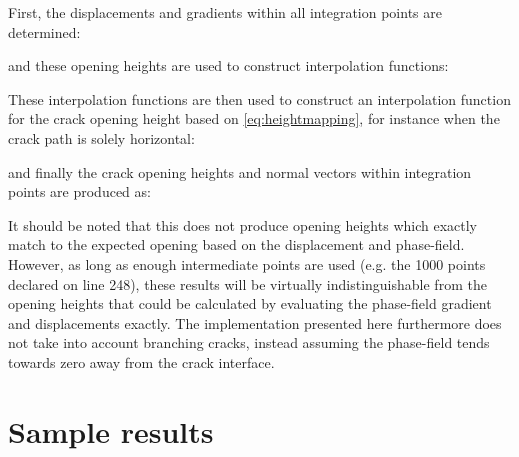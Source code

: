\documentclass[3p]{elsarticle} %
\begin{document}
First, the displacements and gradients within all integration points are determined:

and these opening heights are used to construct interpolation functions:

These interpolation functions are then used to construct an interpolation function for the crack opening height based on \cref{eq:heightmapping}, for instance when the crack path is solely horizontal:

and finally the crack opening heights and normal vectors within integration points are produced as:

It should be noted that this does not produce opening heights which exactly match to the expected opening based on the displacement and phase-field. However, as long as enough intermediate points are used (e.g. the 1000 points declared on line 248), these results will be virtually indistinguishable from the opening heights that could be calculated by evaluating the phase-field gradient and displacements exactly. The implementation presented here furthermore does not take into account branching cracks, instead assuming the phase-field tends towards zero away from the crack interface.

\section{Sample results}
\end{document}
